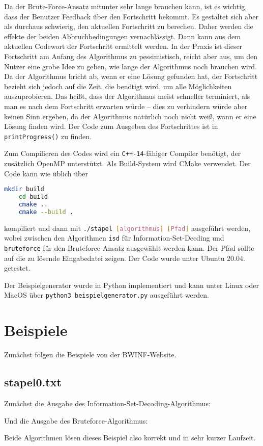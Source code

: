 \documentclass[a4paper,10pt,ngerman]{scrartcl}
\begin{document}
Da der Brute-Force-Ansatz mitunter sehr lange brauchen kann, ist es wichtig, dass der Benutzer Feedback über den Fortschritt bekommt. 
Es gestaltet sich aber als durchaus schwierig, den aktuellen Fortschritt zu berechen. 
Daher werden die effekte der beiden Abbruchbedingungen vernachlässigt. 
Dann kann aus dem aktuellen Codewort der Fortschritt ermittelt werden.
In der Praxis ist dieser Fortschritt am Anfang des Algorithmus zu pessimistisch, reicht aber aus, um den Nutzer eine grobe Idee zu geben, wie lange der Algorithmus noch brauchen wird. 
Da der Algorithmus bricht ab, wenn er eine Lösung gefunden hat, der Fortschritt bezieht sich jedoch auf die Zeit, die benötigt wird, um alle Möglichkeiten auszuprobieren. 
Das heißt, dass der Algorithmus meist schneller terminiert, als man es nach dem Fortschritt erwarten würde -- dies zu verhindern würde aber keinen Sinn ergeben, da der Algorithmus natürlich noch nicht weiß, wann er eine Lösung finden wird. 
Der Code zum Ausgeben des Fortschrittes ist in \lstinline{printProgress()} zu finden.

Zum Compilieren des Codes wird ein \texttt{C++-14}-fähiger Compiler benötigt, der zusätzlich OpenMP unterstützt.
Als Build-System wird CMake verwendet. 
Der Code kann wie üblich über 
\begin{lstlisting}[language=bash]
    mkdir build
    cd build
    cmake ..
    cmake --build . 
\end{lstlisting}    
kompiliert und dann mit \lstinline[language=bash]{./stapel [algorithmus] [Pfad]} ausgeführt werden, wobei zwischen den Algorithmen \lstinline{isd} für Information-Set-Decding und \lstinline{bruteforce} für den Bruteforce-Ansatz ausgewählt werden kann. Der Pfad sollte auf die zu lösende Eingabedatei zeigen. Der Code wurde unter Ubuntu 20.04. getestet.

Der Beispielgenerator wurde in Python implementiert und kann unter Linux oder MacOS über \lstinline[language=bash]{python3 beispielgenerator.py} ausgeführt werden.
\section{Beispiele}
Zunächst folgen die Beispiele von der BWINF-Website.
\subsection*{stapel0.txt}
Zunächst die Ausgabe des Information-Set-Decoding-Algorithmus: 

Und die Ausgabe des Bruteforce-Algorithmus:

Beide Algorithmen lösen dieses Beispiel also korrekt und in sehr kurzer Laufzeit.
\end{document}

